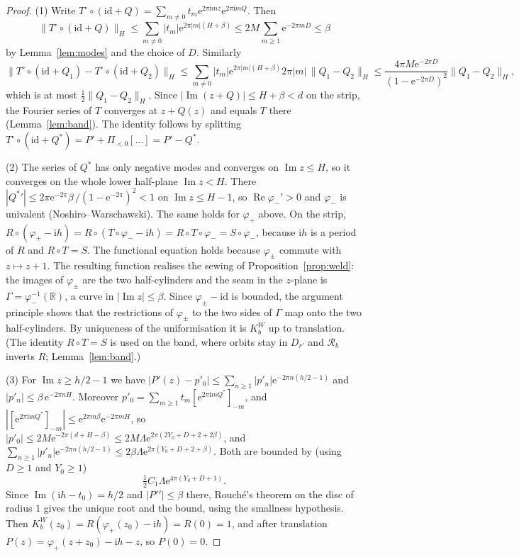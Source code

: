 \documentclass[11pt]{amsart}
\theoremstyle{definition}
\newcommand{\Rr}{R}
\newcommand{\Kk}{K}
\newcommand{\eee}{\mathrm{e}}
\newcommand{\ii}{\mathrm{i}}
\begin{document}
\begin{proof}
(1) Write $T^\circ\circ(\mathrm{id}+Q)=\sum_{m\ne0}t_m\eee^{2\pi\ii mz}\eee^{2\pi\ii mQ}$.
Then
\[
 \|T^\circ\circ(\mathrm{id}+Q)\|_H\le\sum_{m\ne0}|t_m|\eee^{2\pi|m|(H+\beta)}
 \le2M\sum_{m\ge1}\eee^{-2\pi mD}\le\beta
\]
by Lemma~\ref{lem:modes} and the choice of $D$.  Similarly
\[
 \|T^\circ\circ(\mathrm{id}+Q_1)-T^\circ\circ(\mathrm{id}+Q_2)\|_H\le
 \sum_{m\ne0}|t_m|\eee^{2\pi|m|(H+\beta)}2\pi|m|\,\|Q_1-Q_2\|_H
 \le\frac{4\pi M\eee^{-2\pi D}}{(1-\eee^{-2\pi D})^2}\|Q_1-Q_2\|_H ,
\]
which is at most $\tfrac12\|Q_1-Q_2\|_H$.  Since $|\operatorname{Im}(z+Q)|\le H+\beta<d$
on the strip, the Fourier series of $T$ converges at $z+Q(z)$ and equals $T$
there (Lemma~\ref{lem:band}).  The identity follows by splitting
$T^\circ\circ(\mathrm{id}+Q^*)=P'+\Pi_{<0}[\ldots]=P'-Q^*$.

(2) The series of $Q^*$ has only negative modes and converges on
$\operatorname{Im}z\le H$, so it converges on the whole lower half-plane
$\operatorname{Im}z<H$.  There $|{Q^*}'|\le2\pi\eee^{-2\pi}\beta\,/(1-\eee^{-2\pi})^2<1$ on
$\operatorname{Im}z\le H-1$, so $\operatorname{Re}\varphi_-'>0$ and $\varphi_-$
is univalent (Noshiro--Warschawski).  The same holds for $\varphi_+$ above.  On
the strip, $\Rr\circ(\varphi_+-\ii h)=\Rr\circ(T\circ\varphi_--\ii h)
=\Rr\circ T\circ\varphi_-=S\circ\varphi_-$, because $\ii h$ is a period of
$\Rr$ and $\Rr\circ T=S$.  The functional equation holds because $\varphi_\pm$
commute with $z\mapsto z+1$.  The resulting function realises the sewing of
Proposition~\ref{prop:weld}: the images of $\varphi_\pm$ are the two
half-cylinders and the seam in the $z$-plane is $\Gamma=\varphi_-^{-1}(\mathbb R)$, a curve in
$|\operatorname{Im}z|\le\beta$.  Since $\varphi_\pm-\mathrm{id}$ is bounded, the
argument principle shows that the restrictions of $\varphi_\pm$ to the two sides of
$\Gamma$ map onto the two half-cylinders.  By uniqueness of the uniformisation
it is $\Kk^W_b$ up to translation.  (The identity $\Rr\circ T=S$ is used on the
band, where orbits stay in $D_{r'}$ and $\mathcal R_b$ inverts $\Rr$;
Lemma~\ref{lem:band}.)

(3) For $\operatorname{Im}z\ge h/2-1$ we have
$|P'(z)-p'_0|\le\sum_{n\ge1}|p'_n|\eee^{-2\pi n(h/2-1)}$ and
$|p'_n|\le\beta\,\eee^{-2\pi nH}$.  Moreover
$p'_0=\sum_{m\ge1}t_m[\eee^{2\pi\ii mQ^*}]_{-m}$, and
$|[\eee^{2\pi\ii mQ^*}]_{-m}|\le\eee^{2\pi m\beta}\eee^{-2\pi mH}$, so
$|p'_0|\le2M\eee^{-2\pi(d+H-\beta)}\le2M\Lambda\eee^{2\pi(2Y_0+D+2+2\beta)}$, and
$\sum_{n\ge1}|p'_n|\eee^{-2\pi n(h/2-1)}\le2\beta\Lambda\eee^{2\pi(Y_0+D+2+\beta)}$.
Both are bounded by (using $D\ge1$ and $Y_0\ge1$)
\[
 \tfrac12 C_1\Lambda\eee^{4\pi(Y_0+D+1)}.
\]
Since
$\operatorname{Im}(\ii h-t_0)=h/2$ and $|{P'}'|\le\beta$ there, Rouch\'e's theorem
on the disc of radius $1$ gives the unique root and the bound, using the
smallness hypothesis.  Then
$\Kk^W_b(z_0)=\Rr(\varphi_+(z_0)-\ii h)=\Rr(0)=1$, and after translation
$P(z)=\varphi_+(z+z_0)-\ii h-z$, so $P(0)=0$.


\end{proof}
\end{document}
